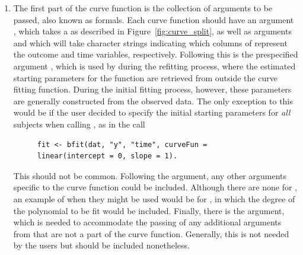 \begin{enumerate}
\item The first part of the curve function is the collection of arguments to be passed, also known as formals. Each curve function should have an argument , which takes a  as described in Figure~\ref{fig:curve_split}, as well as arguments  and  which will take character strings indicating which columns of  represent the outcome and time variables, respectively. Following this is the prespecified argument , which is used by  during the refitting process, where the estimated starting parameters for the function are retrieved from outside the curve fitting function. During the initial fitting process, however, these parameters are generally constructed from the observed data. The only exception to this would be if the user decided to specify the initial starting parameters for \emph{all} subjects when calling , as in the call

\begin{singlespace}
\begin{figure}[H]
\centering
\begin{BVerbatim}
fit <- bfit(dat, "y", "time", curveFun = linear(intercept = 0, slope = 1).
\end{BVerbatim}
\end{figure}
\end{singlespace}
This should not be common. Following the  argument, any other arguments specific to the curve function could be included. Although there are none for , an example of when they might be used would be for , in which the degree of the polynomial to be fit would be included. Finally, there is the  argument, which is needed to accommodate the passing of any additional arguments from  that are not a part of the curve function. Generally, this is not needed by the users but should be included nonetheless. 


\end{enumerate}

